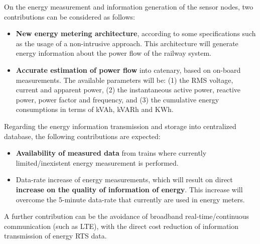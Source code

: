 On the energy measurement and information generation of the sensor nodes, two contributions can be considered as follows:

\begin{itemize}
	\setlength\itemsep{0em}
	
	\item \textbf{New energy metering architecture}, according to some specifications such as the usage of a non-intrusive approach.
	This architecture will generate energy information about the power flow of the railway system.
	
	\item \textbf{Accurate estimation of power flow} into catenary, based on on-board measurements. The available parameters will be: (1) the RMS voltage, current and apparent power, (2) the instantaneous active power, reactive power, power factor and frequency, and (3) the cumulative energy consumptions in terms of kVAh, kVARh and KWh.
	
	
\end{itemize}


Regarding the energy information transmission and storage into centralized database, the following contributions are expected:


\begin{itemize}
	\setlength\itemsep{0em}
	
	\item \textbf{Availability of measured data} from trains where currently limited/inexistent energy measurement is performed.
	
	\item Data-rate increase of energy measurements, which will result on direct \textbf{increase on the quality of information of energy}. This increase will overcome the 5-minute data-rate that currently are used in energy meters.

	
	
\end{itemize}

A further contribution can be the avoidance of broadband real-time/continuous communication (such as \ac{LTE}), with the direct cost reduction of information transmission of energy \ac{RTS} data.

